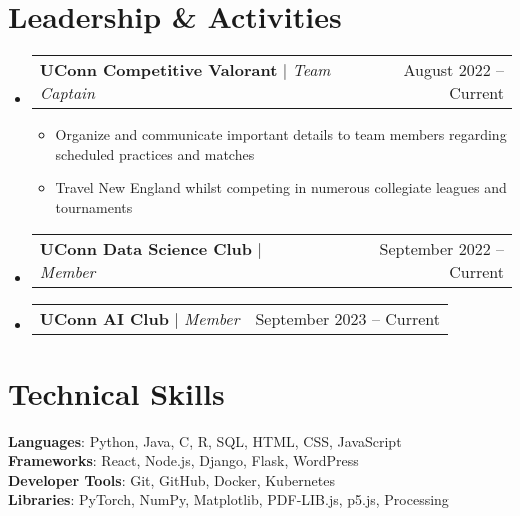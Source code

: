 \documentclass[letterpaper,11pt]{article}
\makeatletter
\newcommand{\resumeItem}[1]{
  \item\small{
    {#1 \vspace{-2pt}}
  }
}
\newcommand{\resumeProjectHeading}[2]{
    \item
    \begin{tabular*}{0.97\textwidth}{l@{\extracolsep{\fill}}r}
      \small#1 & #2 \\
    \end{tabular*}\vspace{-7pt}
}
\newcommand{\resumeSubHeadingListStart}{\begin{itemize}[leftmargin=0.15in, label={}]}
\newcommand{\resumeSubHeadingListEnd}{\end{itemize}}
\newcommand{\resumeItemListStart}{\begin{itemize}}
\newcommand{\resumeItemListEnd}{\end{itemize}\vspace{-5pt}}
\makeatother
\begin{document}

\section{Leadership \& Activities}
    \resumeSubHeadingListStart
      \resumeProjectHeading
          {\textbf{UConn Competitive Valorant} $|$ \emph{Team Captain}}{August 2022 -- Current}
          \resumeItemListStart
            \resumeItem{Organize and communicate important details to team members regarding scheduled practices and matches}
            \resumeItem{Travel New England whilst competing in numerous collegiate leagues and tournaments}
          \resumeItemListEnd
      \resumeProjectHeading
          {\textbf{UConn Data Science Club} $|$ \emph{Member}}{September 2022 -- Current}

        \resumeProjectHeading
          {\textbf{UConn AI Club} $|$ \emph{Member}}{September 2023 -- Current}


    \resumeSubHeadingListEnd

\section{Technical Skills}
 \begin{itemize}[leftmargin=0.15in, label={}]
    \small{\item{
     \textbf{Languages}{: Python, Java, C, R, SQL, HTML, CSS, JavaScript} \\
     \textbf{Frameworks}{: React, Node.js, Django, Flask, WordPress} \\
     \textbf{Developer Tools}{: Git, GitHub, Docker, Kubernetes} \\
     \textbf{Libraries}{: PyTorch, NumPy, Matplotlib, PDF-LIB.js, p5.js, Processing}
    }}
 \end{itemize}

\end{document}
